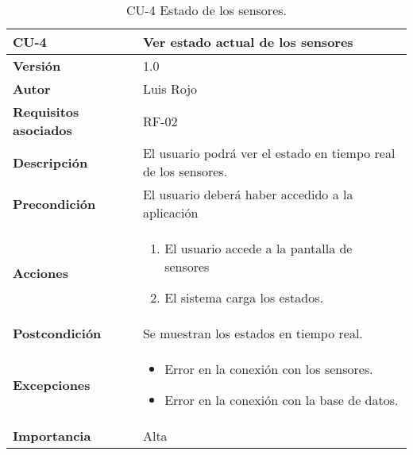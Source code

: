 \begin{table}[p]
	\centering
	\begin{tabularx}{\linewidth}{ p{} p{} }
		\toprule
		\textbf{CU-4}    & \textbf{Ver estado actual de los sensores}\\
		\toprule
		\textbf{Versión}              & 1.0    \\
		\textbf{Autor}                & Luis Rojo \\
		\textbf{Requisitos asociados} & RF-02 \\
		\textbf{Descripción}          & El usuario podrá ver el estado en tiempo real de los sensores. \\
		\textbf{Precondición}         &  El usuario deberá haber accedido a la aplicación \\
		\textbf{Acciones}             &
		\begin{enumerate}
			\def\labelenumi{\arabic{enumi}.}
			\tightlist
			\item El usuario accede a la pantalla de sensores
			\item El sistema carga los estados.
		\end{enumerate}\\
		\textbf{Postcondición}        & Se muestran los estados en tiempo real. \\
		\textbf{Excepciones}          &
            \begin{itemize}
                \item Error en la conexión con los sensores.
                \item Error en la conexión con la base de datos.
            \end{itemize}
           \\
		\textbf{Importancia}          & Alta  \\
		\bottomrule
	\end{tabularx}
	\caption{CU-4 Estado de los sensores.}
\end{table}


